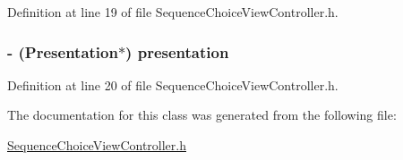 Definition at line 19 of file SequenceChoiceViewController.h.

\hypertarget{interface_sequence_choice_view_controller_a4687fd0668ba32c76160e4d4f1747c12}{
\subsubsection[{presentation}]{\setlength{\rightskip}{0pt plus 5cm}-\/ ({\bf Presentation}$\ast$) presentation}}
\label{interface_sequence_choice_view_controller_a4687fd0668ba32c76160e4d4f1747c12}


Definition at line 20 of file SequenceChoiceViewController.h.



The documentation for this class was generated from the following file:\begin{DoxyCompactItemize}
\item 
\hyperlink{_sequence_choice_view_controller_8h}{SequenceChoiceViewController.h}\end{DoxyCompactItemize}
